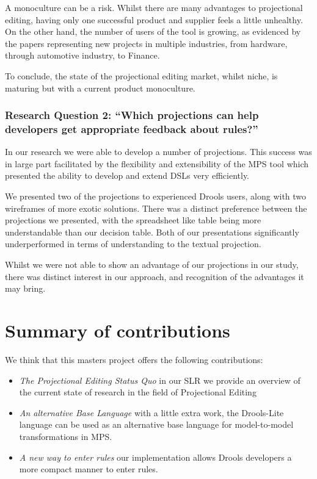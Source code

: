 A monoculture can be a risk.
Whilst there are many advantages to projectional editing, having only one successful product and supplier feels a little unhealthy.
On the other hand, the number of users of the tool is growing, as evidenced by the papers representing new projects in multiple industries, from hardware, through automotive industry, to Finance.

To conclude, the state of the projectional editing market, whilst niche, is maturing but with a current product monoculture.

\subsubsection{Research Question 2: ``Which projections can help developers get appropriate feedback about rules?''}

In our research we were able to develop a number of projections.  
This success was in large part facilitated by the flexibility and extensibility of the MPS tool which presented the ability to develop and extend DSLs very efficiently.

We presented two of the projections to experienced Drools users, along with two wireframes of more exotic solutions.
There was a distinct preference between the projections we presented, with the spreadsheet like table being more understandable than our decision table.
Both of our presentations significantly underperformed in terms of understanding to the textual projection.

Whilst we were not able to show an advantage of our projections in our study, there was distinct interest in our approach, and recognition of the advantages it may bring.

\section{Summary of contributions}

We think that this masters project offers the following contributions:
\begin{itemize}
    \item \emph{The Projectional Editing Status Quo} in our SLR we provide an overview of the current state of research in the field of Projectional Editing
    \item \emph{An alternative Base Language} with a little extra work, the Drools-Lite language can be used as an alternative base language for model-to-model transformations in MPS.
    \item \emph{A new way to enter rules} our implementation allows Drools developers a more compact manner to enter rules.
\end{itemize}

